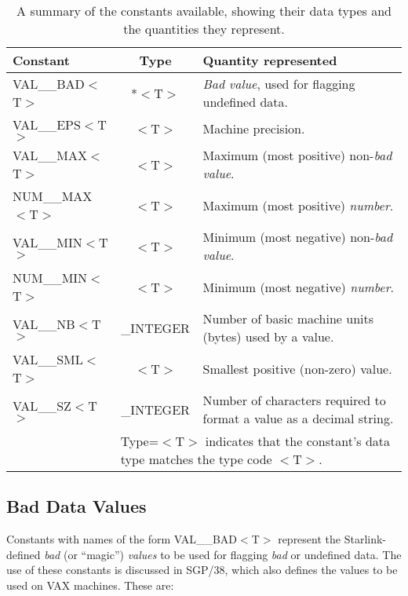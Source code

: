 \documentclass[11pt,nolof]{starlink}
\providecommand{\name}[1]{\mbox{#1}}
\begin{document}
\begin{table}
\begin{center}
\begin{tabular}{|l|c|p{25em}|}
\hline
\textbf{Constant} & \textbf{Type} & \textbf{Quantity represented} \\
\hline
VAL\_\_BAD$<$T$>$ & *$<$T$>$ & \emph{Bad value}, used for flagging undefined
data.
\\
VAL\_\_EPS$<$T$>$ & $<$T$>$ & Machine precision.
\\
VAL\_\_MAX$<$T$>$ & $<$T$>$ & Maximum (most positive) non-\emph{bad value}.
\\
NUM\_\_MAX$<$T$>$ & $<$T$>$ & Maximum (most positive) \emph{number}.
\\
VAL\_\_MIN$<$T$>$ & $<$T$>$ & Minimum (most negative) non-\emph{bad value}.
\\
NUM\_\_MIN$<$T$>$ & $<$T$>$ & Minimum (most negative) \emph{number}.
\\
VAL\_\_NB$<$T$>$ & \_INTEGER & Number of basic machine units (bytes) used
by a value.
\\
VAL\_\_SML$<$T$>$ & $<$T$>$ & Smallest positive (non-zero) value.
\\
VAL\_\_SZ$<$T$>$ & \_INTEGER & Number of characters required to format a
value as a decimal string.
\\
\hline
\multicolumn{1}{|c}{} &
\multicolumn{2}{l|}{\footnotesize *Type=$<$T$>$ indicates that the
constant's data type matches the type code $<$T$>$.} \\
\hline
\end{tabular}
\caption{A summary of the constants available, showing their data types and
the quantities they represent.}
\label{table:constants}
\end{center}
\end{table}

\subsection{Bad Data Values}
\label{section:badconstants}

Constants with names of the form \name{VAL\_\_BAD$<$T$>$} represent the
Starlink-defined \emph{bad} (or ``magic'') \emph{values} to be used for
flagging \emph{bad} or undefined data.
The use of these constants is discussed in SGP/38, which also defines the
values to be used on \name{VAX} machines.
These are:
\end{document}
